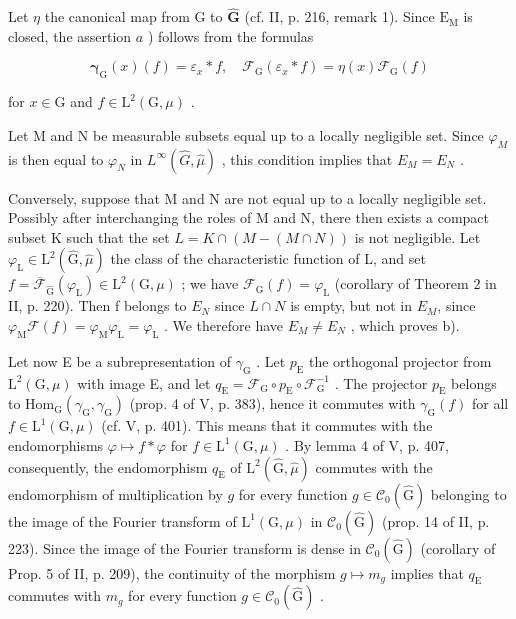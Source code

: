 Let \(\eta\) the canonical map from G to \(\widehat{\mathbf{G}}\) (cf. II, p. 216, remark 1). Since \(\mathrm{E_M}\) is closed, the assertion \(a\) ) follows from the formulas

\[
\boldsymbol {\gamma} _ {\mathrm{G}} (x) (f) = \varepsilon_ {x} * f, \quad \mathcal {F} _ {\mathrm{G}} (\varepsilon_ {x} * f) = \eta (x) \mathcal {F} _ {\mathrm{G}} (f)
\]

for \(x\in \mathrm{G}\) and \(f\in \mathrm{L}^2 (\mathrm{G},\mu)\) .

Let M and N be measurable subsets equal up to a locally negligible set. Since \(\varphi_{M}\) is then equal to \(\varphi_{N}\) in \(L^{\infty}(\widehat{G},\widehat{\mu})\) , this condition implies that \(E_{M}=E_{N}\) .

Conversely, suppose that M and N are not equal up to a locally negligible set. Possibly after interchanging the roles of M and N, there then exists a compact subset K such that the set \(L = K \cap (M - (M \cap N))\) is not negligible. Let \(\varphi_{\mathrm{L}} \in \mathrm{L}^{2}(\widehat{\mathrm{G}}, \widehat{\mu})\) the class of the characteristic function of L, and set \(f = \overline{\mathcal{F}}_{\widehat{\mathrm{G}}}(\varphi_{\mathrm{L}}) \in \mathrm{L}^{2}(\mathrm{G}, \mu)\) ; we have \(\mathcal{F}_{\mathrm{G}}(f) = \varphi_{\mathrm{L}}\) (corollary of Theorem 2 in II, p. 220). Then f belongs to \(E_{N}\) since \(L \cap N\) is empty, but not in \(E_{M}\), since \(\varphi_{\mathrm{M}}\mathcal{F}(f) = \varphi_{\mathrm{M}}\varphi_{\mathrm{L}} = \varphi_{\mathrm{L}}\) . We therefore have \(E_{M} \neq E_{N}\) , which proves b).

Let now E be a subrepresentation of \(\gamma_{\mathrm{G}}\) . Let \(p_{\mathrm{E}}\) the orthogonal projector from \(\mathrm{L}^2 (\mathrm{G},\mu)\) with image E, and let \(q_{\mathrm{E}} = \mathcal{F}_{\mathrm{G}}\circ p_{\mathrm{E}}\circ \mathcal{F}_{\mathrm{G}}^{-1}\) . The projector \(p_{\mathrm{E}}\) belongs to \(\mathrm{Hom}_{\mathrm{G}}(\gamma_{\mathrm{G}},\gamma_{\mathrm{G}})\) (prop. 4 of V, p. 383), hence it commutes with \(\gamma_{\mathrm{G}}(f)\) for all \(f\in \mathrm{L}^{1}(\mathrm{G},\mu)\) (cf. V, p. 401). This means that it commutes with the endomorphisms \(\varphi \mapsto f*\varphi\) for \(f\in \mathrm{L}^{1}(\mathrm{G},\mu)\) . By lemma 4 of V, p. 407, consequently, the endomorphism \(q_{\mathrm{E}}\) of \(\mathrm{L}^2 (\widehat{\mathrm{G}},\widehat{\mu})\) commutes with the endomorphism of multiplication by \(g\) for every function \(g\in \mathcal{C}_0(\widehat{\mathrm{G}})\) belonging to the image of the Fourier transform of \(\mathrm{L}^1 (\mathrm{G},\mu)\) in \(\mathcal{C}_0(\widehat{\mathrm{G}})\) (prop. 14 of II, p. 223). Since the image of the Fourier transform is dense in \(\mathcal{C}_0(\widehat{\mathrm{G}})\) (corollary of Prop. 5 of II, p. 209), the continuity of the morphism \(g\mapsto m_g\) implies that \(q_{\mathrm{E}}\) commutes with \(m_g\) for every function \(g\in \mathcal{C}_0(\widehat{\mathrm{G}})\) .

